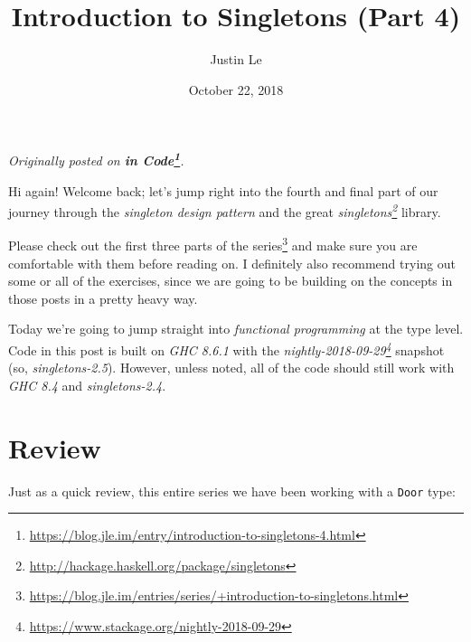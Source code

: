 \documentclass[]{article}
\title{Introduction to Singletons (Part 4)}
\author{Justin Le}
\date{October 22, 2018}
\newenvironment{Shaded}{}{}
\newcommand{\CommentTok}[1]{\textcolor[rgb]{0.38,0.63,0.69}{\textit{#1}}}
\newcommand{\DataTypeTok}[1]{\textcolor[rgb]{0.56,0.13,0.00}{#1}}
\newcommand{\KeywordTok}[1]{\textcolor[rgb]{0.00,0.44,0.13}{\textbf{#1}}}
\newcommand{\NormalTok}[1]{#1}
\newcommand{\OperatorTok}[1]{\textcolor[rgb]{0.40,0.40,0.40}{#1}}
\newcommand{\OtherTok}[1]{\textcolor[rgb]{0.00,0.44,0.13}{#1}}
\renewcommand{\href}[2]{#2\footnote{\url{#1}}}
\begin{document}
\maketitle

\emph{Originally posted on
\textbf{\href{https://blog.jle.im/entry/introduction-to-singletons-4.html}{in
Code}}.}

Hi again! Welcome back; let's jump right into the fourth and final part of our
journey through the \emph{singleton design pattern} and the great
\emph{\href{http://hackage.haskell.org/package/singletons}{singletons}} library.

Please check out
\href{https://blog.jle.im/entries/series/+introduction-to-singletons.html}{the
first three parts of the series} and make sure you are comfortable with them
before reading on. I definitely also recommend trying out some or all of the
exercises, since we are going to be building on the concepts in those posts in a
pretty heavy way.

Today we're going to jump straight into \emph{functional programming} at the
type level. Code in this post is built on \emph{GHC 8.6.1} with the
\emph{\href{https://www.stackage.org/nightly-2018-09-29}{nightly-2018-09-29}}
snapshot (so, \emph{singletons-2.5}). However, unless noted, all of the code
should still work with \emph{GHC 8.4} and \emph{singletons-2.4}.

\hypertarget{review}{%
\section{Review}\label{review}}

Just as a quick review, this entire series we have been working with a
\texttt{Door} type:

\begin{Shaded}
\end{Shaded}
\end{document}
